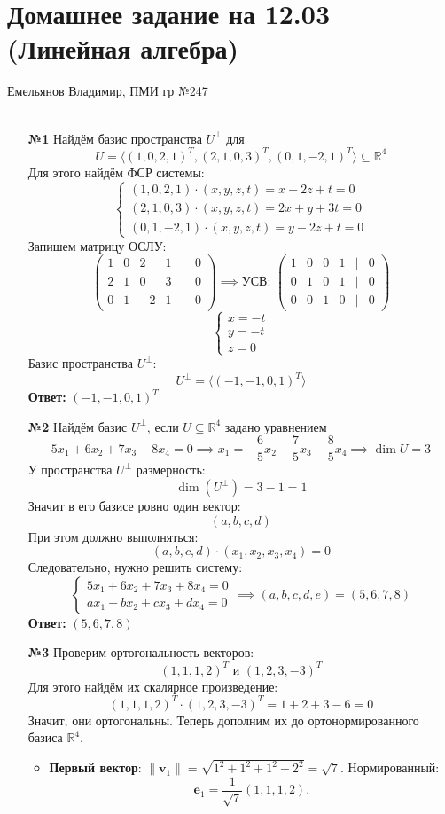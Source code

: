 \documentclass[a4paper]{article}
\newcommand{\mat}[1]{\begin{pmatrix} #1 \end{pmatrix}}
\renewcommand{\f}[2]{\frac{#1}{#2}}
\newcommand{\case}[1]{\begin{cases} #1 \end{cases}}
\begin{document}
\section*{Домашнее задание на 12.03 (Линейная алгебра)}
 {\large Емельянов Владимир, ПМИ гр №247}\\\\
\begin{enumerate}
    \item[\textbf{№1}]Найдём базис пространства \( U^\perp \) для 
    \[ U = \langle (1, 0, 2, 1)^T, (2, 1, 0, 3)^T, (0, 1, -2, 1)^T \rangle \subseteq 
    \mathbb{R}^4 \]
    Для этого найдём ФСР системы:
    $$\case{
        (1,0,2,1) \cdot (x,y,z,t) = x + 2z + t = 0\\
        (2,1,0,3) \cdot (x,y,z,t) = 2x + y + 3t = 0\\
        (0,1,-2,1) \cdot (x,y,z,t) = y - 2z + t = 0
    }$$ 
    Запишем матрицу ОСЛУ:
    $$\mat{
        1 & 0 & 2 & 1& | & 0\\
        2 & 1 & 0 & 3 & | & 0\\
        0 & 1 & -2 & 1& | & 0
    } \implies \text{УСВ: } \mat{1 & 0 & 0 & 1 & | & 0 \\
    0 & 1 & 0 & 1 & | & 0 \\
    0 & 0 & 1 & 0 & | & 0}$$
    $$\case{
        x = -t\\
        y = -t\\
        z = 0
    }$$
    Базис пространства \( U^\perp \):
    $$U^\perp = \langle (-1, -1, 0, 1)^T \rangle$$
    \textbf{Ответ: } $(-1, -1, 0, 1)^T$\\

    \item[\textbf{№2}] Найдём базис \( U^\perp \), если \( U \subseteq \mathbb{R}^4 \) задано уравнением 
    \[ 5x_1 + 6x_2 + 7x_3 + 8x_4 = 0  \implies x_1 = -\f{6}{5}x_2 -\f{7}{5}x_3 - \f{8}{5}x_4 \implies \dim U = 3\]
    У пространства \( U^\perp \) размерность:
    $$\dim (U^\perp) = 3- 1 = 1$$
    Значит в его базисе ровно один вектор:
    $$(a, b, c, d)$$
    При этом должно выполняться:
    $$(a, b, c, d) \cdot (x_1, x_2, x_3, x_4) = 0$$
    Следовательно, нужно решить систему:
    $$\case{
        5x_1 + 6x_2 + 7x_3 + 8x_4 = 0 \\
        ax_1+bx_2 +cx_3+dx_4 = 0
    }\implies (a, b, c, d, e) = (5, 6, 7, 8)$$
    \textbf{Ответ: } $(5, 6, 7, 8)$ \\

    \item[\textbf{№3}]Проверим ортогональность векторов:
    $$\text{\((1, 1, 1, 2)^T\) и \((1, 2, 3, -3)^T\)}$$
    Для этого найдём их скалярное произведение:
    $$(1, 1, 1, 2)^T \cdot (1, 2, 3, -3)^T = 1+2+3 - 6 = 0$$
    Значит, они ортогональны. Теперь дополним их до ортонормированного базиса \(\mathbb{R}^4\).
    \begin{itemize}
        \item \textbf{Первый вектор}:  
        \(\|\mathbf{v}_1\| = \sqrt{1^2 + 1^2 + 1^2 + 2^2} = \sqrt{7}\).  
        Нормированный:
        \[
        \mathbf{e}_1 = \frac{1}{\sqrt{7}}(1, 1, 1, 2).
        \]


\end{itemize}
\end{enumerate}
\end{document}
